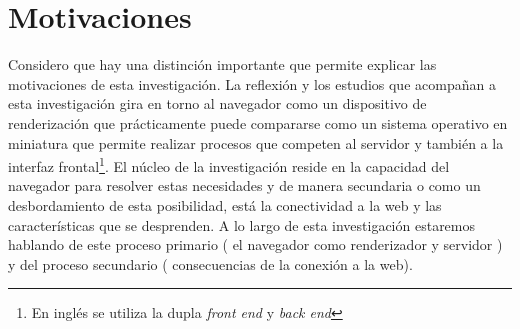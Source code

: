 






\section{Motivaciones}

Considero que hay una distinción importante que permite explicar las motivaciones de esta investigación. La reflexión y los estudios que acompañan a esta investigación gira en torno al navegador como un dispositivo de renderización que prácticamente puede compararse como un sistema operativo en miniatura que permite realizar procesos que competen al servidor y también a la interfaz frontal\footnote{En inglés se utiliza la dupla \emph{front end} y \emph{back end}}. El núcleo de la investigación reside en la capacidad del navegador para resolver estas necesidades y de manera secundaria o como un desbordamiento de esta posibilidad, está la conectividad a la web y las características que se desprenden. A lo largo de esta investigación estaremos hablando de este proceso primario ( el navegador como renderizador y servidor ) y del proceso secundario ( consecuencias de la conexión a la web). 

